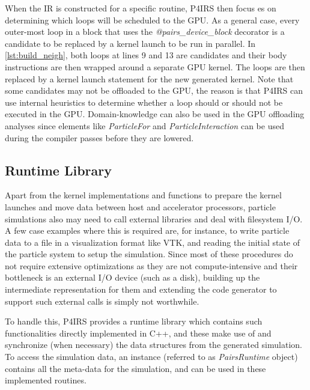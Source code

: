 \documentclass[Afour,sageh,times]{sagej}
\newcommand{\RMchange}[1]{{\color{blue} #1}}
\begin{document}
\RMchange{When} the IR is constructed for a specific routine, P4IRS then focus\RMchange{es} on determining which loops will be scheduled to the GPU.
As a general case, every outer-most loop in a block that uses the \emph{@pairs\_device\_block} decorator is a candidate to be replaced by a kernel launch to be run in parallel.
In \autoref{lst:build_neigh}, both loops at lines 9 and 13 are candidates and their body instructions are then wrapped around a separate GPU kernel.
The loops are then replaced by a kernel launch statement for the new generated kernel.
Note that some candidates may not be offloaded to the GPU, the reason is that P4IRS can use internal heuristics to determine whether a loop should or should not be executed in the GPU.
Domain-knowledge can also be used in the GPU offloading analyses since elements like \emph{ParticleFor} and \emph{ParticleInteraction} can be used during the compiler passes before they are lowered.

\subsection{Runtime \RMchange{Library}}

Apart from the kernel implementations and functions to prepare the kernel launches and move data between host and accelerator processors, particle simulations also may need to call external libraries and deal with filesystem I/O.
A few case examples where this is required are, for instance, to write particle data to a file in a visualization format like VTK, and reading the initial state of the particle system to setup the simulation.
Since most of these procedures do not require extensive optimizations as they are not compute-intensive and their bottleneck is an external I/O device (such as a disk), building up the intermediate representation for them and extending the code generator to support such external calls is simply not worthwhile.

To handle this, P4IRS provides a runtime library which contains such functionalities directly implemented in C++, and these make use of and synchronize (when necessary) the data structures from the generated simulation.
To access the simulation data, an instance (referred to as \emph{PairsRuntime} object) contains all the meta-data for the simulation, and can be used in these implemented routines.
\end{document}
